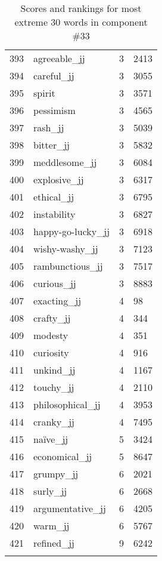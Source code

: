 \begin{longtable}[!htbp]{| rlr@{.}l |}
    393 & agreeable\_jj & 3 & 2413 \\
    394 & careful\_jj & 3 & 3055 \\
    395 & spirit & 3 & 3571 \\
    396 & pessimism & 3 & 4565 \\
    397 & rash\_jj & 3 & 5039 \\
    398 & bitter\_jj & 3 & 5832 \\
    399 & meddlesome\_jj & 3 & 6084 \\
    400 & explosive\_jj & 3 & 6317 \\
    401 & ethical\_jj & 3 & 6795 \\
    402 & instability & 3 & 6827 \\
    403 & happy-go-lucky\_jj & 3 & 6918 \\
    404 & wishy-washy\_jj & 3 & 7123 \\
    405 & rambunctious\_jj & 3 & 7517 \\
    406 & curious\_jj & 3 & 8883 \\
    407 & exacting\_jj & 4 & 98 \\
    408 & crafty\_jj & 4 & 344 \\
    409 & modesty & 4 & 351 \\
    410 & curiosity & 4 & 916 \\
    411 & unkind\_jj & 4 & 1167 \\
    412 & touchy\_jj & 4 & 2110 \\
    413 & philosophical\_jj & 4 & 3953 \\
    414 & cranky\_jj & 4 & 7495 \\
    415 & naïve\_jj & 5 & 3424 \\
    416 & economical\_jj & 5 & 8647 \\
    417 & grumpy\_jj & 6 & 2021 \\
    418 & surly\_jj & 6 & 2668 \\
    419 & argumentative\_jj & 6 & 4205 \\
    420 & warm\_jj & 6 & 5767 \\
    421 & refined\_jj & 9 & 6242 \\
    \hline
    \caption{Scores and rankings for most extreme 30 words in component \#33} \\
\end{longtable}
